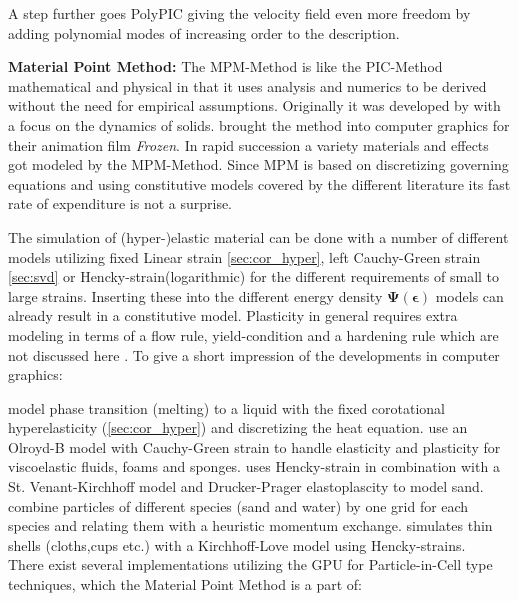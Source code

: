 \documentclass[m,times]{cgMA}
\begin{document}
A step further goes PolyPIC giving the velocity field even more freedom by adding polynomial modes of increasing order to the description. \cite{MPM:POLYPIC}

\textbf{Material Point Method:} The MPM-Method is like the PIC-Method mathematical and physical in that it uses analysis and numerics to be derived without the need for empirical assumptions. Originally it was developed by \cite{sulsky1995application} with a focus on the dynamics of solids. \cite{MPM:SNOW} brought the method into computer graphics for their animation film \textit{Frozen}. In rapid succession a variety materials and effects got modeled by the MPM-Method. Since MPM is based on discretizing governing equations and using constitutive models covered by the different literature its fast rate of expenditure is not a surprise.

The simulation of (hyper-)elastic material can be done with a number of different models utilizing fixed Linear strain \ref{sec:cor_hyper}, left Cauchy-Green strain \ref{sec:svd} or Hencky-strain(logarithmic) \cite{MPM:SHELLS} for the different requirements of small to large strains. Inserting these into the different energy density $\boldsymbol{\Psi}(\boldsymbol{\epsilon})$ models can already result in a constitutive model. Plasticity in general requires extra modeling in terms of a flow rule, yield-condition and a hardening rule which are not discussed here \cite{ochsner2014elasto}. To give a short impression of the developments in computer graphics:

\cite{MPM:PHASE_CHANGE} model phase transition (melting) to a liquid with the fixed corotational hyperelasticity (\ref{sec:cor_hyper}) and discretizing the heat equation. \cite{MPM:OLROYDB} use an Olroyd-B model with Cauchy-Green strain to handle elasticity and plasticity for viscoelastic fluids, foams and sponges. \cite{MPM:DRUCKER} uses Hencky-strain in combination with a St. Venant-Kirchhoff model and Drucker-Prager elastoplascity to model sand.
\cite{MPM:MULTI} combine particles of different species (sand and water) by one grid for each species and relating them with a heuristic momentum exchange. \cite{MPM:SHELLS} simulates thin shells (cloths,cups etc.) with a Kirchhoff-Love model using Hencky-strains.
\\

There exist several implementations utilizing the GPU for Particle-in-Cell type techniques, which the Material Point Method is a part of:
\end{document}
